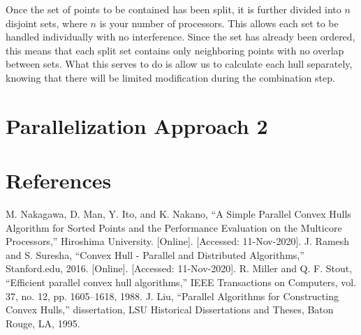 \documentclass[conference]{IEEEtran}
\begin{document}
Once the set of points to be contained has been split, it is further divided into $n$ disjoint sets, where $n$ is your number of processors. This allows each set to be handled individually with no interference. Since the set has already been ordered, this means that each split set contains only neighboring points with no overlap between sets. What this serves to do is allow us to calculate each hull separately, knowing that there will be limited modification during the combination step.

\section{Parallelization Approach 2}

\section{References}
\begin{thebibliography}{00}
 M. Nakagawa, D. Man, Y. Ito, and K. Nakano, “A Simple Parallel Convex Hulls Algorithm for Sorted Points and the Performance Evaluation on the Multicore Processors,” Hiroshima University. [Online]. [Accessed: 11-Nov-2020].
 J. Ramesh and S. Suresha, “Convex Hull - Parallel and Distributed Algorithms,” Stanford.edu,
2016. [Online]. [Accessed: 11-Nov-2020].
 R. Miller and Q. F. Stout, “Efficient parallel convex hull algorithms,” IEEE Transactions on Computers, vol. 37, no. 12, pp. 1605–1618, 1988.
 J. Liu, “Parallel Algorithms for Constructing Convex Hulls,” dissertation, LSU Historical Dissertations and Theses, Baton Rouge, LA, 1995.
\end{thebibliography}
\end{document}
